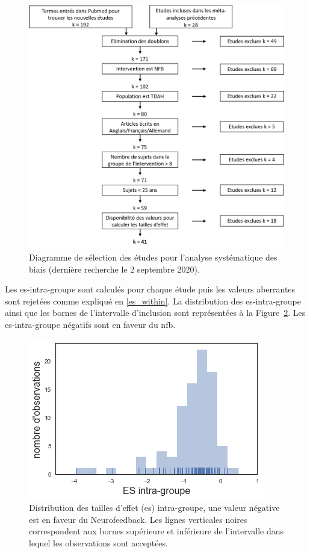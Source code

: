 \newpage\
\begin{figure}[h!]
  \centering
	\includegraphics[width=1\linewidth]{figures/chapter-3/factors-selection-studies} 
  \caption{Diagramme de sélection des études pour l'analyse systématique des biais (dernière recherche le 2 septembre 2020).} 
  \label{Figure:factors_pipeline_selection_studies}
\end{figure}

Les \gls{es}-intra-groupe sont calculés pour chaque étude puis les valeurs aberrantes sont rejetées comme expliqué en \ref{es_within}. 
La distribution des \gls{es}-intra-groupe ainsi que les bornes de l'intervalle d'inclusion sont représentées à la 
Figure~\ref{Figure:distribution_ES_within}. Les \gls{es}-intra-groupe négatifs sont en faveur du \gls{nfb}.

\begin{figure}[h!]
  \centering
	\includegraphics[width=0.5\linewidth]{figures/chapter-3/distribution-ES-within} 
  \caption{Distribution des tailles d'effet (\gls{es}) intra-groupe, une valeur négative est en faveur du Neurofeedback. Les lignes 
	verticales noires correspondent aux bornes supérieure et 
	inférieure de l'intervalle dans lequel les observations sont acceptées.}
  \label{Figure:distribution_ES_within}
\end{figure}

